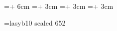     \makeatletter
    \long{}
    \makeatother
  \else
    \paperwidth=\dimexpr \paperwidth + 6cm\relax
    \oddsidemargin=\dimexpr\oddsidemargin + 3cm\relax
    \evensidemargin=\dimexpr\evensidemargin + 3cm\relax
    \marginparwidth=\dimexpr \marginparwidth + 3cm\relax
    \setlength{\marginparwidth}{4.6cm}
  \fi
  \makeatother
\fi


\usepackage[textsize=tiny]{todonotes}
\usepackage[normalem]{ulem}

\makeatletter
\font\uwavefont=lasyb10 scaled 652
\newcommand\colorwave[1][blue]{\bgroup\markoverwith{\lower3\p@\hbox{\uwavefont\textcolor{#1}{\char58}}}\ULon}

